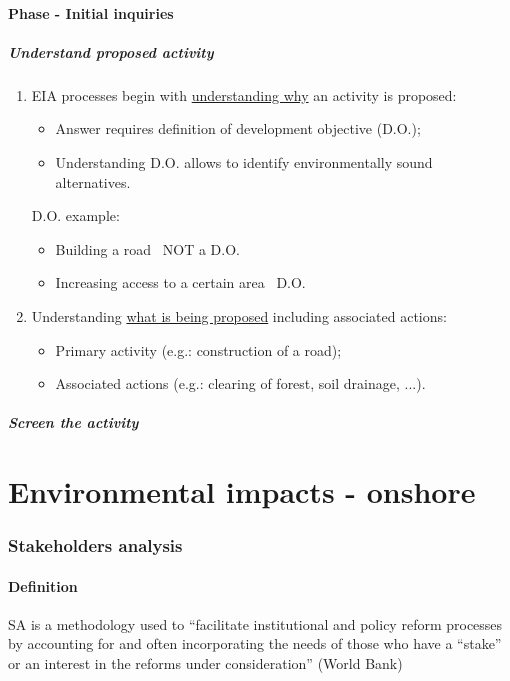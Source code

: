 \documentclass{article}
\newcommand{\tra}{\textrightarrow\ }
\begin{document}
\subsection{Phase  - Initial inquiries}
\subsubsection{Understand proposed activity}
\begin{enumerate}
    \item EIA processes begin with \underline{understanding why} an activity is proposed:
    \begin{itemize}
        \item Answer requires definition of development objective (D.O.);
        \item Understanding D.O. allows to identify environmentally sound alternatives.
    \end{itemize}

    D.O. example:
    \begin{itemize}
        \item Building a road \tra NOT a D.O.
        \item Increasing access to a certain area \tra D.O.
    \end{itemize}
    
    \item Understanding \underline{what is being proposed} including associated actions:
    \begin{itemize}
        \item Primary activity (e.g.: construction of a road);
        \item Associated actions (e.g.: clearing of forest, soil drainage, ...).
    \end{itemize}
\end{enumerate}

\subsubsection{Screen the activity}


\newpage
\part{Environmental impacts - onshore}
\section{Stakeholders analysis}
\subsection{Definition}
SA is a methodology used to ``facilitate institutional and policy reform processes by accounting
for and often incorporating the needs of those who have a ``stake'' or an interest in the reforms
under consideration'' (World Bank)
\end{document}
